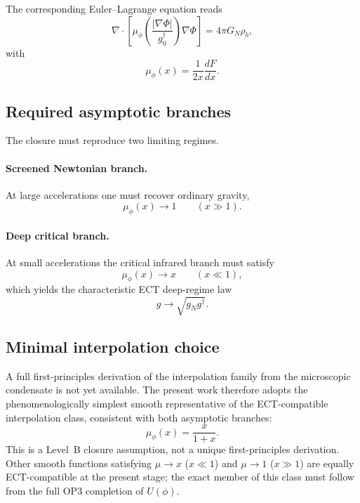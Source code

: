 \documentclass[11pt,a4paper]{article}
\numberwithin{equation}{section}
\begin{document}
The corresponding Euler--Lagrange equation reads
\begin{equation}
\nabla\!\cdot\!\left[
\mu_\phi\!\left(\frac{|\nabla\Phi|}{g^\dagger_0}\right)\nabla\Phi
\right]
=
4\pi G_N \rho_b,
\label{eq:app_gal_mu_eq}
\end{equation}
with
\begin{equation}
\mu_\phi(x)=\frac{1}{2x}\frac{dF}{dx}.
\label{eq:app_mu_from_F}
\end{equation}

\subsection{Required asymptotic branches}

The closure must reproduce two limiting regimes.

\paragraph{Screened Newtonian branch.}
At large accelerations one must recover ordinary gravity,
\begin{equation}
\mu_\phi(x)\to 1
\qquad (x\gg 1).
\end{equation}

\paragraph{Deep critical branch.}
At small accelerations the critical infrared branch must satisfy
\begin{equation}
\mu_\phi(x)\to x
\qquad (x\ll 1),
\end{equation}
which yields the characteristic ECT deep-regime law
\begin{equation}
g\to \sqrt{g_N g^\dagger}.
\end{equation}

\subsection{Minimal interpolation choice}

A full first-principles derivation of the interpolation family from the
microscopic condensate is not yet available.  The present work therefore adopts the phenomenologically simplest
smooth representative of the ECT-compatible interpolation class,
consistent with both asymptotic branches:
\begin{equation}
\mu_\phi(x)=\frac{x}{1+x}.
\label{eq:app_mu_choice}
\end{equation}
This is a Level~B closure assumption, not a unique first-principles
derivation.  Other smooth functions satisfying $\mu\to x$ ($x\ll1$)
and $\mu\to 1$ ($x\gg1$) are equally ECT-compatible at the present
stage; the exact member of this class must follow from the
full OP3 completion of $U(\phi)$.
\end{document}
